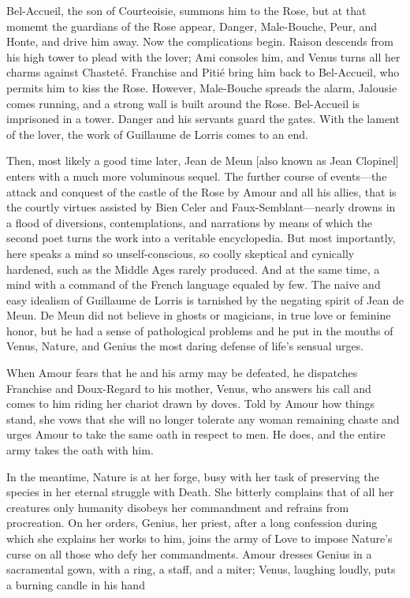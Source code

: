 Bel-Accueil, the son of Courteoisie, summons him to the Rose, but at
that momemt the guardians of the Rose appear, Danger, Male-Bouche, Peur,
and Honte, and drive him away. Now the complications begin. Raison
descends from his high tower to plead with the lover; Ami consoles him,
and Venus turns all her charms against Chasteté. Franchise and Pitié
bring him back to Bel-Accueil, who permits him to kiss the Rose.
However, Male-Bouche spreads the alarm, Jalousie comes running, and a
strong wall is built around the Rose. Bel-Accueil is imprisoned in a
tower. Danger and his servants guard the gates. With the lament of the
lover, the work of Guillaume de Lorris comes to an end.

Then, most likely a good time later, Jean de Meun {[}also known as Jean
Clopinel{]} enters with a much more voluminous sequel. The further
course of events---the attack and conquest of the castle of the Rose by
Amour and all his allies, that is the courtly virtues assisted by Bien
Celer and Faux-Semblant---nearly drowns in a flood of diversions,
contemplations, and narrations by means of which the second poet turns
the work into a veritable encyclopedia. But most importantly, here
speaks a mind so unself-conscious, so coolly skeptical and cynically
hardened, such as the Middle Ages rarely produced. And at the same time,
a mind with a command of the French language equaled by few. The naive
and easy idealism of Guillaume de Lorris is tarnished by the negating
spirit of Jean de Meun. De Meun did not believe in ghosts or magicians,
in true love or feminine honor, but he had a sense of pathological
problems
\protect\hypertarget{11_Chapter_Four__THE_FORMS_OF_LOVE.xhtmlux5cux23page_135}{}{}and
he put in the mouths of Venus, Nature, and Genius the most daring
defense of life's sensual urges.

When Amour fears that he and his army may be defeated, he dispatches
Franchise and Doux-Regard to his mother, Venus, who answers his call and
comes to him riding her chariot drawn by doves. Told by Amour how things
stand, she vows that she will no longer tolerate any woman remaining
chaste and urges Amour to take the same oath in respect to men. He does,
and the entire army takes the oath with him.

In the meantime, Nature is at her forge, busy with her task of
preserving the species in her eternal struggle with Death. She bitterly
complains that of all her creatures only humanity disobeys her
commandment and refrains from procreation. On her orders, Genius, her
priest, after a long confession during which she explains her works to
him, joins the army of Love to impose Nature's curse on all those who
defy her commandments. Amour dresses Genius in a sacramental gown, with
a ring, a staff, and a miter; Venus, laughing loudly, puts a burning
candle in his hand


